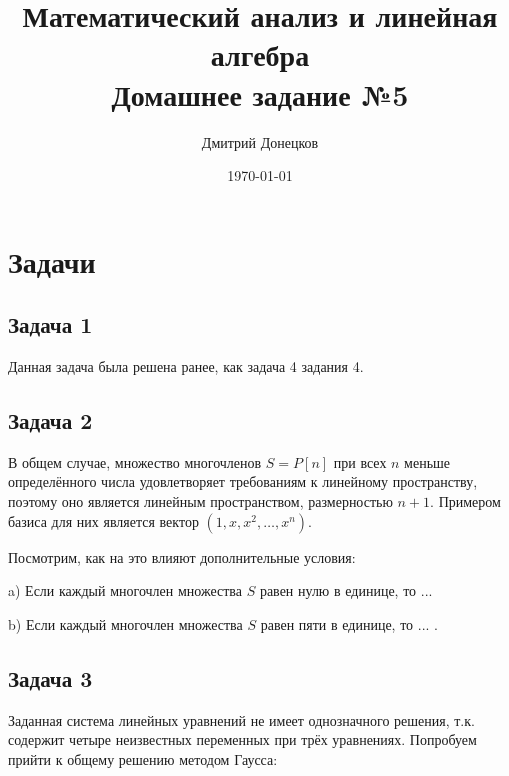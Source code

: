 \documentclass[a4paper,11pt]{article}
\title{\vspace{-1.5cm}Математический анализ и линейная алгебра \\
Домашнее задание №5}
\author{Дмитрий Донецков}
\date{\today}
\begin{document}
\maketitle

\section{Задачи}

\subsection{Задача 1}

Данная задача была решена ранее, как задача 4 задания 4.

\subsection{Задача 2}

В общем случае, множество многочленов $S = P[n]$ при всех $n$ меньше определённого числа удовлетворяет требованиям к линейному пространству, поэтому оно является линейным пространством, размерностью $n+1$. Примером базиса для них является вектор $(1, x, x^2, \dots, x^n)$.

Посмотрим, как на это влияют дополнительные условия:

a) Если каждый многочлен множества $S$ равен нулю в единице, то ...

b) Если каждый многочлен множества $S$ равен пяти в единице, то ... .

\subsection{Задача 3}

Заданная система линейных уравнений не имеет однозначного решения, т.к. содержит четыре неизвестных переменных при трёх уравнениях. Попробуем прийти к общему решению методом Гаусса:
\end{document}
